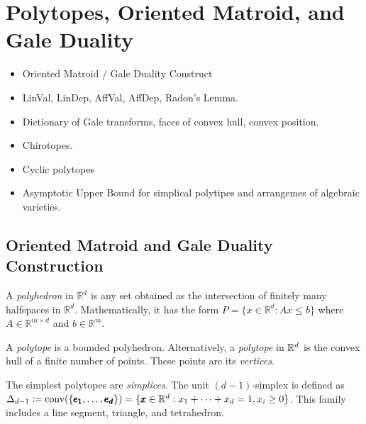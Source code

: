 \section{Polytopes, Oriented Matroid, and Gale Duality}

\begin{itemize}
    \item Oriented Matroid / Gale Duality Construct
    \item LinVal, LinDep, AffVal, AffDep, Radon's Lemma.
    \item Dictionary of Gale transforms, faces of convex hull, convex position.
    \item Chirotopes.
    \item Cyclic polytopes
    \item Asymptotic Upper Bound for simplical polytipes and arrangemes of algebraic varieties.
\end{itemize}

\subsection{Oriented Matroid and Gale Duality Construction}

\begin{definition}[Polyhedron]
    A \textit{polyhedron} in $\mathbb{R}^d$ is any set obtained as the intersection of finitely many halfspaces in $\mathbb{R}^d$.
    Mathematically, it has the form $P = \{x \in \mathbb{R}^d: Ax \leq b \}$ where $A \in \mathbb{R}^{m\times d}$ and $b \in \mathbb{R}^m$.
\end{definition}

\begin{definition}[Polytope]
    A \textit{polytope} is a bounded polyhedron.
    Alternatively, a \textit{polytope} in $\mathbb{R}^d$ is the convex hull of a finite number of points.
    These points are its \textit{vertices}.
\end{definition}

\begin{definition}[Simplices]
    The simplest polytopes are \textit{simplices}.
    The unit $(d-1)$-simplex is defined as $\Delta_{d-1} \coloneqq \text{conv}(\{\pmb{e_1}, \dots, \pmb{e_d}\}) = \{ \pmb{x} \in \mathbb{R}^d : x_1 + \dots + x_d = 1, x_i \geq 0 \}$.
    This family includes a line segment, triangle, and tetrahedron.
\end{definition}

